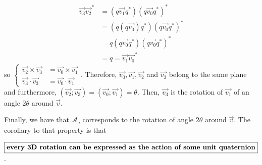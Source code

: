 \documentclass[class=report, float=false, crop=false]{standalone}
\begin{document}
\begin{description}
\begin{align*}
\vec{v_3}\vec{v_2}^* &= (q\vec{v_1}q^*)(q\vec{v_0}q^*)^*\\
&= (q(q\vec{v_0})q^*)(q\vec{v_0}q^*)^*\\
&=  q(q\vec{v_0}q^*)(q\vec{v_0}q^*)^*\\
&=q=\vec{v_1}\vec{v_0}^*
\end{align*}
so \(\begin{cases} \vec{v_2}\times\vec{v_3} &= \vec{v_0}\times\vec{v_1} \\ \vec{v_3}\cdot\vec{v_3} &= \vec{v_0} \cdot \vec{v_1} \end{cases} \). Therefore, $\vec{v_0}, \vec{v_1}, \vec{v_2}$ and $\vec{v_3}$ belong to the same plane and furthermore, $(\vec{v_2};\vec{v_3}) = (\vec{v_0};\vec{v_1}) = \theta$. Then, $\vec{v_3}$ is the rotation of $\vec{v_1}$ of an angle $2\theta$ around $\vec{v}$.\\
\end{description}

Finally, we have that $\mathcal{A}_q$ corresponds to the rotation of angle $2\theta$ around $\vec{v}$. The corollary to that property is that

\begin{center}$\boxed{\text{\textbf{every 3D rotation can be expressed as the action of some unit quaternion}}}$.\end{center}

% 
\end{document}
